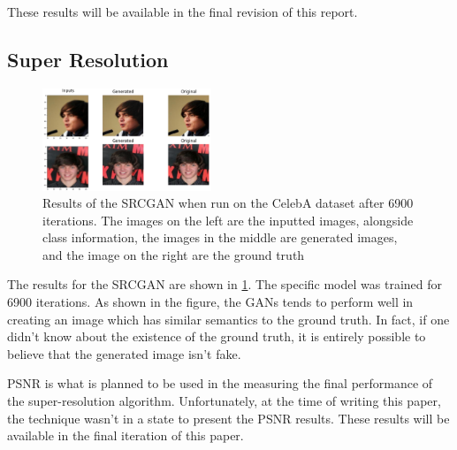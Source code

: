 These results will be available in the final revision of this report.

\subsection{Super Resolution}

\begin{figure}
	\centering
	\includegraphics[width=0.45\textwidth]{images/gan-res.png}
	\caption{Results of the SRCGAN when run on the CelebA dataset after 6900
	iterations. The images on the left are the inputted images, alongside class
	information, the images in the middle are generated images, and the image on
	the right are the ground truth}
	\label{fig:gan-res}
\end{figure}

The results for the SRCGAN are shown in \ref{fig:gan-res}. The specific model was
trained for 6900 iterations. As shown in the figure, the GANs tends to perform
well in creating an image which has similar semantics to the ground truth. In
fact, if one didn’t know about the existence of the ground truth, it is entirely
possible to believe that the generated image isn’t fake.

PSNR is what is planned to be used in the measuring the final performance of the
super-resolution algorithm. Unfortunately, at the time of writing this paper,
the technique wasn’t in a state to present the PSNR results. These results will
be available in the final iteration of this paper.
